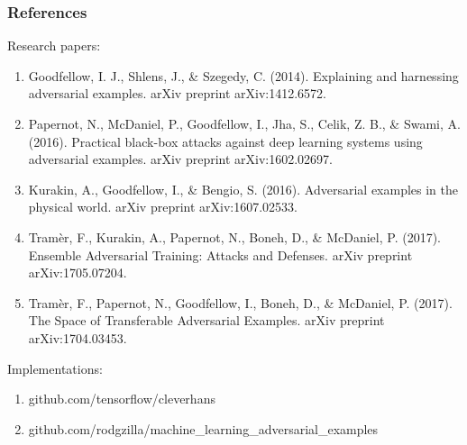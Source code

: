 \documentclass[9pt]{beamer}
\begin{document}
\begin{frame}
  \frametitle{References}

  Research papers:
  {\footnotesize
    \begin{enumerate}
    \item Goodfellow, I. J., Shlens, J., \& Szegedy,
      C. (2014). Explaining and harnessing adversarial
      examples. arXiv preprint arXiv:1412.6572.
    \item Papernot, N., McDaniel, P., Goodfellow, I., Jha, S., Celik,
      Z. B., \& Swami, A. (2016). Practical black-box attacks against
      deep learning systems using adversarial examples. arXiv preprint
      arXiv:1602.02697.
    \item Kurakin, A., Goodfellow, I., \& Bengio,
      S. (2016). Adversarial examples in the physical world. arXiv
      preprint arXiv:1607.02533.
    \item Tramèr, F., Kurakin, A., Papernot, N., Boneh, D., \&
      McDaniel, P. (2017). Ensemble Adversarial Training: Attacks and
      Defenses. arXiv preprint arXiv:1705.07204.
    \item Tramèr, F., Papernot, N., Goodfellow, I., Boneh, D., \&
      McDaniel, P. (2017). The Space of Transferable Adversarial
      Examples. arXiv preprint arXiv:1704.03453.
    \end{enumerate}
  }

  \bigskip

  Implementations:
  \begin{enumerate}
  \item github.com/tensorflow/cleverhans
  \item github.com/rodgzilla/machine\_learning\_adversarial\_examples
  \end{enumerate}

\end{frame}

\appendix
\end{document}
